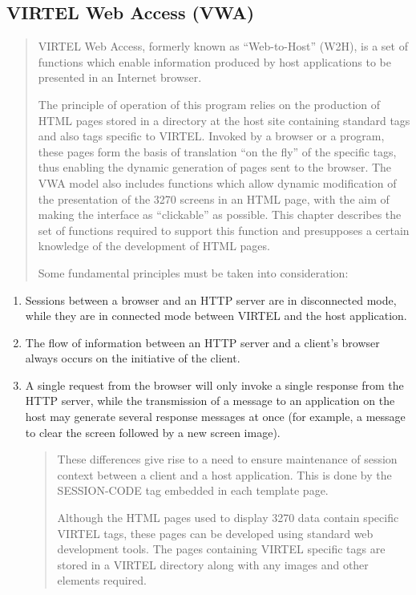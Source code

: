 \documentclass[letterpaper,10pt,english]{sphinxmanual}
\begin{document}
\subsection{VIRTEL Web Access (VWA)}
\label{\detokenize{User_Guide:virtel-web-access-vwa}}\begin{quote}

VIRTEL Web Access, formerly known as “Web-to-Host” (W2H), is a set
of functions which enable information produced by host applications
to be presented in an Internet browser.

The principle of operation of this program relies on the production
of HTML pages stored in a directory at the host site containing
standard tags and also tags specific to VIRTEL. Invoked by a browser
or a program, these pages form the basis of translation “on the fly”
of the specific tags, thus enabling the dynamic generation of pages
sent to the browser. The VWA model also includes functions which
allow dynamic modification of the presentation of the 3270 screens
in an HTML page, with the aim of making the interface as “clickable”
as possible. This chapter describes the set of functions required to
support this function and presupposes a certain knowledge of the
development of HTML pages.

Some fundamental principles must be taken into consideration:
\end{quote}
\begin{enumerate}
\item {} 
Sessions between a browser and an HTTP server are in disconnected
mode, while they are in connected mode between VIRTEL and the host
application.

\item {} 
The flow of information between an HTTP server and a client’s browser
always occurs on the initiative of the client.

\item {} 
A single request from the browser will only invoke a single response
from the HTTP server, while the transmission of a message to an
application on the host may generate several response messages at
once (for example, a message to clear the screen followed by a new
screen image).
\begin{quote}

These differences give rise to a need to ensure maintenance of
session context between a client and a host application. This is
done by the SESSION-CODE tag embedded in each template page.

Although the HTML pages used to display 3270 data contain specific
VIRTEL tags, these pages can be developed using standard web
development tools. The pages containing VIRTEL specific tags are
stored in a VIRTEL directory along with any images and other
elements required.
\end{quote}

\end{enumerate}
\end{document}
